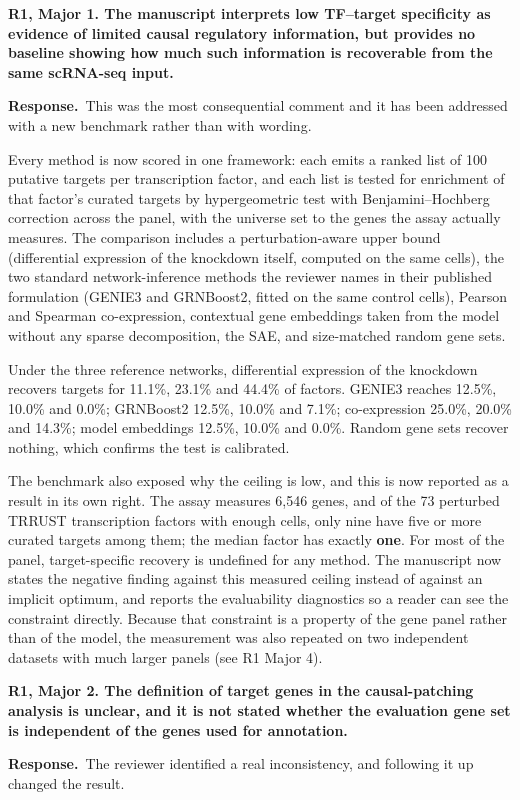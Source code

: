 \documentclass[11pt]{article}
\newcommand{\point}[1]{\vspace{0.7em}\noindent\textbf{#1}\par\vspace{0.15em}}
\newcommand{\reply}{\par\vspace{0.3em}\noindent\textbf{Response.}\ }
\begin{document}
\point{R1, Major 1. The manuscript interprets low TF--target specificity as evidence of limited
causal regulatory information, but provides no baseline showing how much such information is
recoverable from the same scRNA-seq input.}
\reply This was the most consequential comment and it has been addressed with a new benchmark rather
than with wording.

Every method is now scored in one framework: each emits a ranked list of 100 putative targets per
transcription factor, and each list is tested for enrichment of that factor's curated targets by
hypergeometric test with Benjamini--Hochberg correction across the panel, with the universe set to
the genes the assay actually measures. The comparison includes a perturbation-aware upper bound
(differential expression of the knockdown itself, computed on the same cells), the two standard
network-inference methods the reviewer names in their published formulation (GENIE3 and GRNBoost2,
fitted on the same control cells), Pearson and Spearman co-expression, contextual gene embeddings
taken from the model without any sparse decomposition, the SAE, and size-matched random gene sets.

Under the three reference networks, differential expression of the knockdown recovers targets for
11.1\%, 23.1\% and 44.4\% of factors. GENIE3 reaches 12.5\%, 10.0\% and 0.0\%; GRNBoost2 12.5\%,
10.0\% and 7.1\%; co-expression 25.0\%, 20.0\% and 14.3\%; model embeddings 12.5\%, 10.0\% and
0.0\%. Random gene sets recover nothing, which confirms the test is calibrated.

The benchmark also exposed why the ceiling is low, and this is now reported as a result in its own
right. The assay measures 6,546 genes, and of the 73 perturbed TRRUST transcription factors with
enough cells, only nine have five or more curated targets among them; the median factor has exactly
\textbf{one}. For most of the panel, target-specific recovery is undefined for any method. The
manuscript now states the negative finding against this measured ceiling instead of against an
implicit optimum, and reports the evaluability diagnostics so a reader can see the constraint
directly. Because that constraint is a property of the gene panel rather than of the model, the
measurement was also repeated on two independent datasets with much larger panels (see R1 Major 4).

\point{R1, Major 2. The definition of target genes in the causal-patching analysis is unclear, and
it is not stated whether the evaluation gene set is independent of the genes used for annotation.}
\reply The reviewer identified a real inconsistency, and following it up changed the result.
\end{document}
